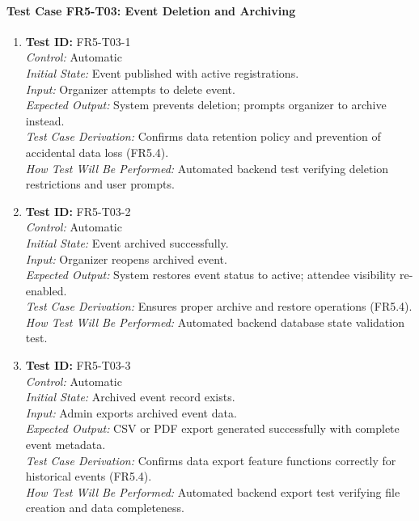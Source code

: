 \documentclass[12pt, titlepage]{article}
\begin{document}
\paragraph{Test Case FR5-T03: Event Deletion and Archiving}

\begin{enumerate}\setlength{\itemsep}{1em}
    \item \textbf{Test ID:} FR5-T03-1\\[0.5em]
    \textit{Control:} Automatic\\[0.3em]
    \textit{Initial State:} Event published with active registrations.\\[0.3em]
    \textit{Input:} Organizer attempts to delete event.\\[0.3em]
    \textit{Expected Output:} System prevents deletion; prompts organizer to archive instead.\\[0.3em]
    \textit{Test Case Derivation:} Confirms data retention policy and prevention of accidental data loss (FR5.4).\\[0.3em]
    \textit{How Test Will Be Performed:} Automated backend test verifying deletion restrictions and user prompts.

    \item \textbf{Test ID:} FR5-T03-2\\[0.5em]
    \textit{Control:} Automatic\\[0.3em]
    \textit{Initial State:} Event archived successfully.\\[0.3em]
    \textit{Input:} Organizer reopens archived event.\\[0.3em]
    \textit{Expected Output:} System restores event status to active; attendee visibility re-enabled.\\[0.3em]
    \textit{Test Case Derivation:} Ensures proper archive and restore operations (FR5.4).\\[0.3em]
    \textit{How Test Will Be Performed:} Automated backend database state validation test.

    \item \textbf{Test ID:} FR5-T03-3\\[0.5em]
    \textit{Control:} Automatic\\[0.3em]
    \textit{Initial State:} Archived event record exists.\\[0.3em]
    \textit{Input:} Admin exports archived event data.\\[0.3em]
    \textit{Expected Output:} CSV or PDF export generated successfully with complete event metadata.\\[0.3em]
    \textit{Test Case Derivation:} Confirms data export feature functions correctly for historical events (FR5.4).\\[0.3em]
    \textit{How Test Will Be Performed:} Automated backend export test verifying file creation and data completeness.
\end{enumerate}
\end{document}

